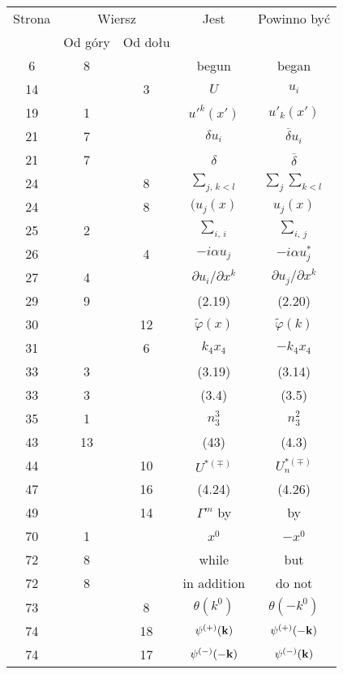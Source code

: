 \documentclass[a4paper,11pt]{article}
\numberwithin{equation}{section}
\begin{document}
\begin{center}

  \begin{tabular}{|c|c|c|c|c|}
    \hline
    Strona & \multicolumn{2}{c|}{Wiersz} & Jest
                              & Powinno być \\ \cline{2-3}
    & Od góry & Od dołu & & \\
    \hline
    6 & 8 & & begun & began \\
    14 & & 3 & $U$ & $u_{ i }$ \\
    19 & 1 & & $u'^{ k }( x' )$ & $u'_{ k }( x' )$ \\
    21 & 7 & & $\delta u_{ i }$ & $\overline{ \delta } u_{ i }$ \\
    21 & 7 & & $\delta$ & $\overline{ \delta }$ \\
    24 & & 8 & $\sum\limits_{ j,\, k < l }$
           & $\sum\limits_{ j } \sum\limits_{ k < l }$ \\
    24 & & 8 & $( u_{ j }( x )$ & $u_{ j }( x )$ \\
    25 & 2 & & $\sum\limits_{ i,\, i }$ & $\sum\limits_{ i,\, j }$ \\
    26 & & 4 & $-i \alpha u_{ j }$ & $-i \alpha u_{ j }^{ * }$ \\
    27 & 4 & & $\partial u_{ i } / \partial x^{ k }$
           & $\partial u_{ j } / \partial x^{ k }$ \\
    29 & 9 & & (2.19) & (2.20) \\
    30 & & 12 & $\tilde{ \varphi }( x )$ & $\tilde{ \varphi }( k )$ \\
    31 & & 6 & $k_{ 4 } x_{ 4 }$ & $-k_{ 4 } x_{ 4 }$ \\
    33 & 3 & & (3.19) & (3.14) \\
    33 & 3 & & (3.4) & (3.5) \\
    35 & 1 & & $n_{ 3 }^{ 3 }$ & $n_{ 3 }^{ 2 }$ \\
    43 & 13 & & (43) & (4.3) \\
    44 & & 10 & $U^{ *( \mp ) }$ & $U_{ n }^{ *( \mp ) }$ \\
    47 & & 16 & (4.24) & (4.26) \\
    49 & & 14 & $\Gamma^{ m }$ by & by \\
    70 & 1 & & $x^{ 0 }$ & $-x^{ 0 }$ \\
    72 & 8 & & while & but \\
    72 & 8 & & in addition & do not \\
    73 & & 8 & $\theta( k^{ 0 } )$ & $\theta( -k^{ 0 } )$ \\
    74 & & 18 & $\psi^{ ( + ) }( \mathbf{k} )$
           & $\psi^{ ( + ) }( -\mathbf{k} )$ \\
    74 & & 17 & $\psi^{ ( - ) }( -\mathbf{k} )$
           & $\psi^{ ( - ) }( \mathbf{k} )$ \\
    \hline
  \end{tabular}


\end{center}
\end{document}
